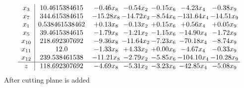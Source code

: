 \documentclass[8pt]{article}
\begin{document}
\[\begin{array}{c| c c@{\hskip 2pt} c@{\hskip 2pt} c@{\hskip 2pt} c@{\hskip 2pt} c@{\hskip 2pt} }
 x_{3}   &  10.4615384615 & -0.46 x_{8} & -0.54 x_{2} & -0.15 x_{6} & -4.23 x_{4} & -0.38 x_{9}\\
 x_{7}   &  344.615384615 & -15.28 x_{8} & -14.72 x_{2} & -8.54 x_{6} & -131.64 x_{4} & -14.51 x_{9}\\
 x_{1}   &  0.538461538462 & +  0.13 x_{8} & -0.13 x_{2} & +  0.15 x_{6} & +  0.56 x_{4} & +  0.05 x_{9}\\
 x_{5}   &  39.4615384615 & -1.79 x_{8} & -1.21 x_{2} & -1.15 x_{6} & -14.90 x_{4} & -1.72 x_{9}\\
 x_{10}   &  218.692307692 & -9.36 x_{8} & -11.64 x_{2} & -7.23 x_{6} & -70.18 x_{4} & -8.74 x_{9}\\
 x_{11}   &  12.0 & -1.33 x_{8} & +  4.33 x_{2} & +  0.00 x_{6} & -4.67 x_{4} & -0.33 x_{9}\\
 x_{12}   &  239.538461538 & -11.21 x_{8} & -2.79 x_{2} & -5.85 x_{6} & -104.10 x_{4} & -10.28 x_{9}\\
\hline
z    &  118.692307692 & -4.69 x_{8} & -5.31 x_{2} & -3.23 x_{6} & -42.85 x_{4} & -5.08 x_{9}\\
\end{array}\]
 After cutting plane is added 
\end{document}
